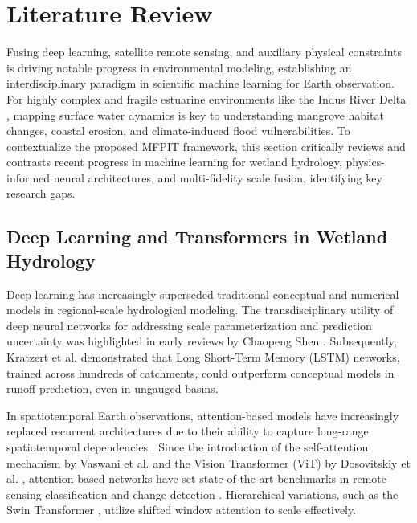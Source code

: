 \documentclass[journal]{IEEEtran}
\begin{document}
\section{Literature Review}
Fusing deep learning, satellite remote sensing, and auxiliary physical constraints is driving notable progress in environmental modeling, establishing an interdisciplinary paradigm in scientific machine learning for Earth observation. For highly complex and fragile estuarine environments like the Indus River Delta \cite{haider_gridded_2025}, mapping surface water dynamics is key to understanding mangrove habitat changes, coastal erosion, and climate-induced flood vulnerabilities. To contextualize the proposed MFPIT framework, this section critically reviews and contrasts recent progress in machine learning for wetland hydrology, physics-informed neural architectures, and multi-fidelity scale fusion, identifying key research gaps.

\subsection{Deep Learning and Transformers in Wetland Hydrology}
Deep learning has increasingly superseded traditional conceptual and numerical models in regional-scale hydrological modeling. The transdisciplinary utility of deep neural networks for addressing scale parameterization and prediction uncertainty was highlighted in early reviews by Chaopeng Shen \cite{shen_transdisciplinary_2018}. Subsequently, Kratzert et al. \cite{kratzert_toward_2019, kratzert_rainfallrunoff_2021} demonstrated that Long Short-Term Memory (LSTM) networks, trained across hundreds of catchments, could outperform conceptual models in runoff prediction, even in ungauged basins. 

In spatiotemporal Earth observations, attention-based models have increasingly replaced recurrent architectures due to their ability to capture long-range spatiotemporal dependencies \cite{sit_comprehensive_2020, lees_benchmarking_2021}. Since the introduction of the self-attention mechanism by Vaswani et al. \cite{vaswani_attention_2017} and the Vision Transformer (ViT) by Dosovitskiy et al. \cite{dosovitskiy_image_2021}, attention-based networks have set state-of-the-art benchmarks in remote sensing classification and change detection \cite{bazi_vision_2021}. Hierarchical variations, such as the Swin Transformer \cite{liu_swin_2021}, utilize shifted window attention to scale effectively. 
\end{document}
